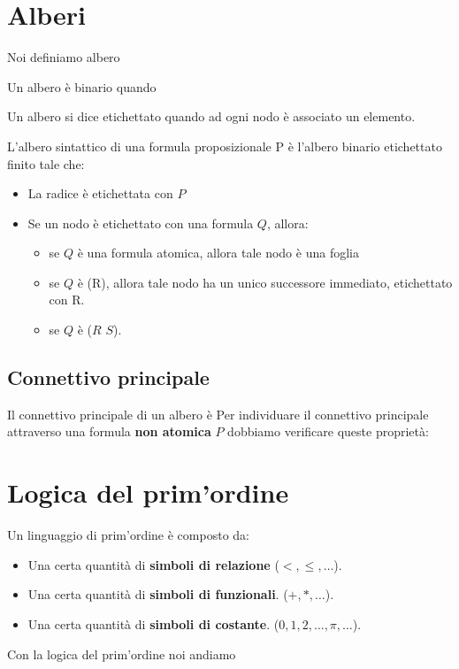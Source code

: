 \documentclass{article}
\begin{document}
\section{Alberi}
Noi definiamo albero \par
Un albero è binario quando \par 
Un albero si dice etichettato quando ad ogni nodo è associato un elemento. \par
L'albero sintattico di una formula proposizionale P è l'albero binario etichettato finito tale che:
\begin{itemize}
        \item La radice è etichettata con $P$
        \item Se un nodo è etichettato con una formula  $Q$, allora:
                \begin{itemize}
                        \item se $Q$ è una formula atomica, allora tale nodo è una foglia
                        \item se $Q$ è (R), allora tale nodo ha un unico successore immediato, etichettato con R.
                        \item se $Q$ è ($R$ $S$).
                \end{itemize}
\end{itemize}


\subsection{Connettivo principale}
Il connettivo principale di un albero è  
Per individuare il connettivo principale attraverso una formula \textbf{non atomica} $P$ dobbiamo verificare queste proprietà:




\newpage
\section{Logica del prim'ordine}
Un linguaggio di prim'ordine è composto da:
\begin{itemize}
        \item Una certa quantità di \textbf{simboli di relazione} ($ <,\le,\ldots $).
        \item Una certa quantità di \textbf{simboli di funzionali}. ($ +,*,\ldots $).
        \item Una certa quantità di \textbf{simboli di costante}. ($ 0,1,2,\ldots,\pi,\ldots $).
\end{itemize}
Con la logica del prim'ordine noi andiamo 
\end{document}
